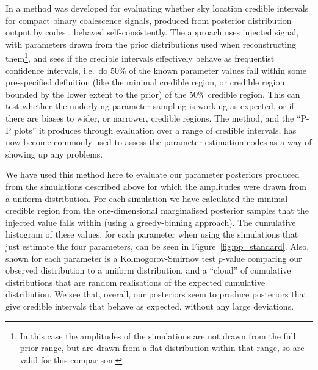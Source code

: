 In \citet{2014PhRvD..89h4060S} a method was developed for evaluating whether sky location credible intervals for compact binary coalescence \gw signals, produced
from posterior distribution output by \lalinf codes \citep{2015PhRvD..91d2003V}, behaved self-consistently. The approach uses injected signal, with parameters
drawn from the prior distributions used when reconstructing them\footnote{In this case the amplitudes of the simulations are not drawn from the full prior range,
but are drawn from a flat distribution within that range, so are valid for this comparison.}, and sees if the credible intervals effectively behave as frequentist
confidence intervals, i.e.\ do 50\% of the known parameter values fall within some pre-specified definition (like the minimal credible region, or credible
region bounded by the lower extent to the prior) of the 50\% credible region. This can test whether the underlying \lalinf parameter sampling is working as
expected, or if there are biases to wider, or narrower, credible regions. The method, and the ``P-P plots'' it produces through evaluation over a range of credible
intervals, has now become commonly used to assess the \lalinf parameter estimation codes \citep{2015PhRvD..91d2003V} as a way of showing up any problems.

We have used this method here to evaluate our parameter posteriors produced from the simulations described above for which the amplitudes were drawn from
a uniform distribution. For each simulation we have calculated the minimal credible region from the one-dimensional marginalised posterior samples that the
injected value falls within (using a greedy-binning approach). The cumulative histogram of these values, for each parameter when using the simulations that
just estimate the four \gw parameters, can be seen in Figure~\ref{fig:pp_standard}. Also, shown for each parameter is a Kolmogorov-Smirnov test $p$-value
comparing our observed distribution to a uniform distribution, and a ``cloud'' of cumulative distributions that are random realisations of the expected
cumulative distribution. We see that, overall, our posteriors seem to produce posteriors that give credible intervals that behave as expected, without any
large deviations.

